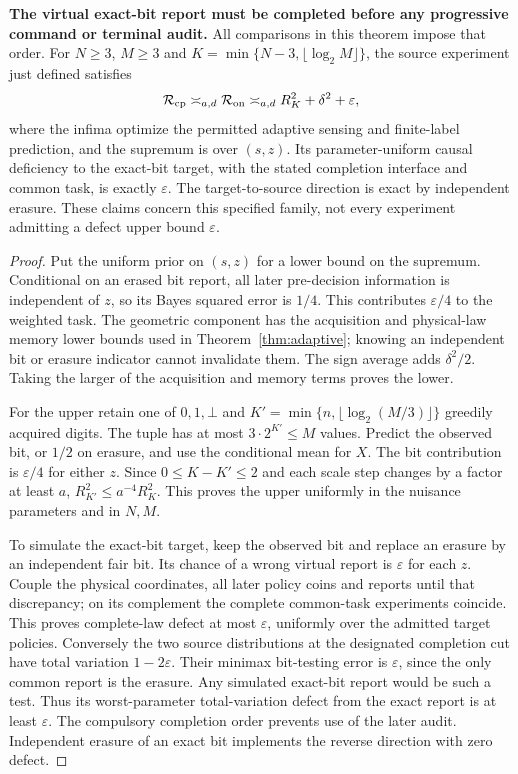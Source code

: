 \begin{theorem}\label{thm:joint}
\textbf{The virtual exact-bit report must be completed before any progressive command or terminal audit.} All comparisons in this theorem impose that order.
For $N\ge3$, $M\ge3$ and $K=\min\{N-3,\lfloor\log_2M\rfloor\}$, the source experiment just defined satisfies
\begin{equation}\label{eq:jointlaw}
 \mathcal R_{\mathrm{cp}}\asymp_{a,d}\mathcal R_{\mathrm{on}}
 \asymp_{a,d}R_K^2+\delta^2+\varepsilon,
\end{equation}
where the infima optimize the permitted adaptive sensing and finite-label prediction, and the supremum is over $(s,z)$. Its parameter-uniform causal deficiency to the exact-bit target, with the stated completion interface and common task, is exactly $\varepsilon$. The target-to-source direction is exact by independent erasure. These claims concern this specified family, not every experiment admitting a defect upper bound $\varepsilon$.
\end{theorem}
\begin{proof}
Put the uniform prior on $(s,z)$ for a lower bound on the supremum. Conditional on an erased bit report, all later pre-decision information is independent of $z$, so its Bayes squared error is $1/4$. This contributes $\varepsilon/4$ to the weighted task. The geometric component has the acquisition and physical-law memory lower bounds used in Theorem~\ref{thm:adaptive}; knowing an independent bit or erasure indicator cannot invalidate them. The sign average adds $\delta^2/2$. Taking the larger of the acquisition and memory terms proves the lower.

For the upper retain one of $0,1,\bot$ and $K'=\min\{n,\lfloor\log_2(M/3)\rfloor\}$ greedily acquired digits. The tuple has at most $3\cdot2^{K'}\le M$ values. Predict the observed bit, or $1/2$ on erasure, and use the conditional mean for $X$. The bit contribution is $\varepsilon/4$ for either $z$. Since $0\le K-K'\le2$ and each scale step changes by a factor at least $a$, $R_{K'}^2\le a^{-4}R_K^2$. This proves the upper uniformly in the nuisance parameters and in $N,M$.

To simulate the exact-bit target, keep the observed bit and replace an erasure by an independent fair bit. Its chance of a wrong virtual report is $\varepsilon$ for each $z$. Couple the physical coordinates, all later policy coins and reports until that discrepancy; on its complement the complete common-task experiments coincide. This proves complete-law defect at most $\varepsilon$, uniformly over the admitted target policies. Conversely the two source distributions at the designated completion cut have total variation $1-2\varepsilon$. Their minimax bit-testing error is $\varepsilon$, since the only common report is the erasure. Any simulated exact-bit report would be such a test. Thus its worst-parameter total-variation defect from the exact report is at least $\varepsilon$. The compulsory completion order prevents use of the later audit. Independent erasure of an exact bit implements the reverse direction with zero defect.
\end{proof}


